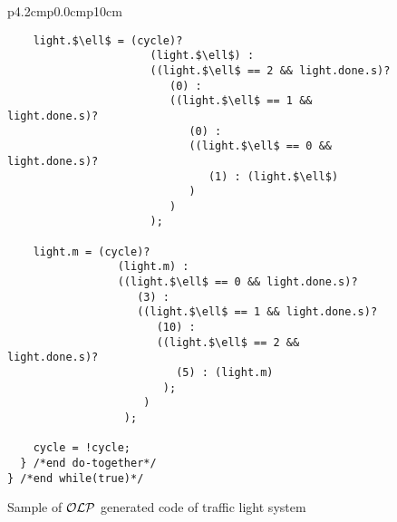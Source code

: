 \begin{figure*}
\begin{tabular}{p{4.2cm}p{0.0cm}p{10cm}}
\begin{lstlisting}
    light.$\ell$ = (cycle)? 
                      (light.$\ell$) : 
                      ((light.$\ell$ == 2 && light.done.s)? 
                         (0) : 
                         ((light.$\ell$ == 1 && light.done.s)? 
                            (0) : 
                            ((light.$\ell$ == 0 && light.done.s)? 
                               (1) : (light.$\ell$)
                            )
                         )
                      );
              
    light.m = (cycle)? 
                 (light.m) : 
                 ((light.$\ell$ == 0 && light.done.s)? 
                    (3) : 
                    ((light.$\ell$ == 1 && light.done.s)? 
                       (10) : 
                       ((light.$\ell$ == 2 && light.done.s)? 
                          (5) : (light.m)
                        );
                     )
                  );
    
    cycle = !cycle; 
  } /*end do-together*/ 
} /*end while(true)*/
\end{lstlisting}
\end{tabular}
\vspace{-2em}
\caption{Sample of $\mathcal{OLP}$ generated code of traffic light system}
\label{fig:caigtraffic}
\end{figure*}

